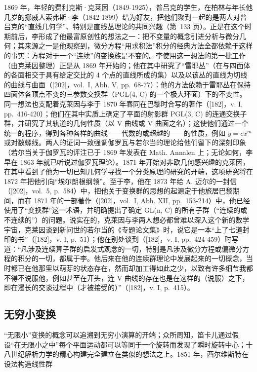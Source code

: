 1869 年，年轻的费利克斯·克莱因（1849-1925），普吕克的学生，在柏林与年长他几岁的挪威人索弗斯·李（1842-1899）结为好友，把他们聚到一起的是两人对普吕克的“直线几何学”、特别是直线丛理论的共同兴趣（第~133 页）。正是在这个时期前后，李形成了他最富原创性的想法之一：把不变量的概念引进分析与微分几何；其来源之一是他观察到，微分方程“用求积法”积分的经典方法全都依赖于这样的事实：方程对于一个“连续”的变换族是不变的。李使用这一想法的第一批工作（由克莱因整理）正是从 1869 年开始的；他在其中研究了“雷耶丛”（在与四面体的各面相交于具有给定交比的 4 个点的直线所成的集）以及以该丛的直线为切线的曲线与曲面（{[}202{]}，vol.~I, Abh. V, pp.~68-77）：他的方法依赖于雷耶丛在保持四面体各顶点不变的三参数交换群（PGL(4, C) 的一个极大环面）下的不变性。同一想法也支配着克莱因与李于 1870 年春同在巴黎时合写的著作（{[}182{]}，v. I, pp.~416-420）；他们在其中实质上确定了平面的射影群 PGL(3, C) 的连通交换子群，并研究了其轨道的几何性质（以 V 曲线或 V 曲面之名）；这使他们通过一个统一的程序，得到各种各样的曲线——代数的或超越的——的性质，例如 \(y = cx^m\) 或对数螺线。两人的证词一致强调伽罗瓦与若尔当的理论给他们留下的深刻印象（若尔当关于伽罗瓦的评注已于 1869 年发表在 Math. Annalen 上；无论如何，李早在 1863 年就已听说过伽罗瓦理论）。1871 年开始对非欧几何感兴趣的克莱因，在其中看到了他为一切已知几何学寻找一个分类原理的研究的开端，这项研究将在 1872 年把他引向“埃尔朗根纲领”。至于李，他在 1873 年给 A. 迈尔的一封信（{[}202{]}，vol.~5, p.~584）中，把他关于变换群的思想的起源定于他旅居巴黎期间，而在 1871 年的一部著作（{[}202{]}，vol.~I, Abh. XII, pp.~153-214）中，他已经使用了“变换群”这一术语，并明确提出了确定 GL(n, C) 的所有子群（“连续的或不连续的”）的问题。说实在的，克莱因与李两人想必都曾难以深入这个新的数学宇宙，克莱因谈到新问世的若尔当的《专题论文集》时，说它是一本“上了七道封印的书”（{[}182{]}，v. I, p.~51）；他在别处谈到（{[}182{]}，v. I, pp.~424-459）时写道：“凡涉及连续算子群的启发式观念的一切，特别是凡涉及微分方程或偏微分方程的积分的一切，都属于李。他后来在他的连续群理论中发展起来的一切概念，当时都已在他那里以萌芽的状态存在，然而却加工得如此之少，以致有许多细节我都不得不说服他，例如甚至在开头，连 V 曲线的存在也是在这样的（说服）之下，即在漫长的交谈过程中（才被接受的）”（{[}182{]}，v. I, p.~415）。

\subsection{无穷小变换}

“无限小”变换的概念可以追溯到无穷小演算的开端；众所周知，笛卡儿通过假设“在无限小之中”每个平面运动都可以等同于一个旋转而发现了瞬时旋转中心；十八世纪解析力学的精心构建完全建立在类似的想法之上。1851 年，西尔维斯特在设法构造线性群

